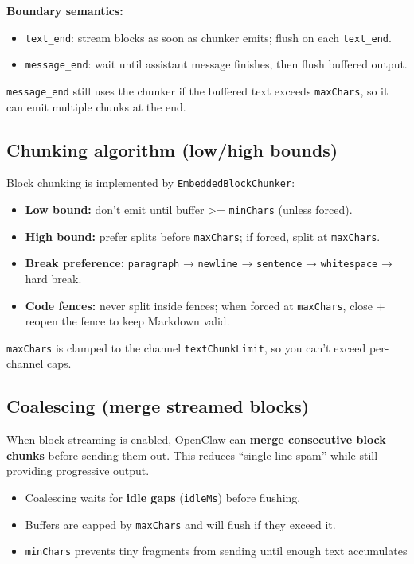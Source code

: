 \textbf{Boundary semantics:}

\begin{itemize}
  \item \texttt{text\_end}: stream blocks as soon as chunker emits; flush on each \texttt{text\_end}.
  \item \texttt{message\_end}: wait until assistant message finishes, then flush buffered output.
\end{itemize}


\texttt{message\_end} still uses the chunker if the buffered text exceeds \texttt{maxChars}, so it can emit multiple chunks at the end.

\subsection{Chunking algorithm (low/high bounds)}


Block chunking is implemented by \texttt{EmbeddedBlockChunker}:

\begin{itemize}
  \item \textbf{Low bound:} don’t emit until buffer >= \texttt{minChars} (unless forced).
  \item \textbf{High bound:} prefer splits before \texttt{maxChars}; if forced, split at \texttt{maxChars}.
  \item \textbf{Break preference:} \texttt{paragraph} → \texttt{newline} → \texttt{sentence} → \texttt{whitespace} → hard break.
  \item \textbf{Code fences:} never split inside fences; when forced at \texttt{maxChars}, close + reopen the fence to keep Markdown valid.
\end{itemize}


\texttt{maxChars} is clamped to the channel \texttt{textChunkLimit}, so you can’t exceed per-channel caps.

\subsection{Coalescing (merge streamed blocks)}


When block streaming is enabled, OpenClaw can \textbf{merge consecutive block chunks}
before sending them out. This reduces “single-line spam” while still providing
progressive output.

\begin{itemize}
  \item Coalescing waits for \textbf{idle gaps} (\texttt{idleMs}) before flushing.
  \item Buffers are capped by \texttt{maxChars} and will flush if they exceed it.
  \item \texttt{minChars} prevents tiny fragments from sending until enough text accumulates
\end{itemize}

